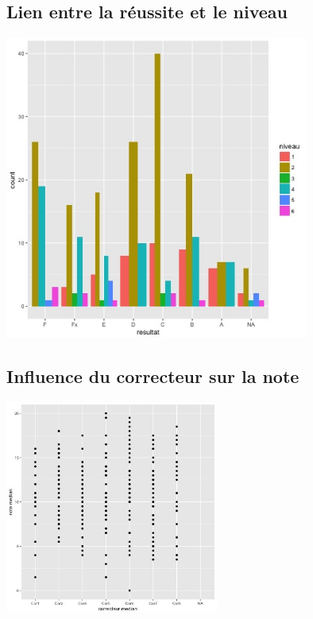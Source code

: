 \documentclass[]{report}
\begin{document}
\subsection{Lien entre la réussite et le niveau}

		\begin{center}
		\includegraphics[width=100mm]{Figures/Notes/niveau_resultat.jpg}
		\label{fig:niveau_resultat}
		\end{center}

\subsection{Influence du correcteur sur la note}

	\begin{center}
	\includegraphics[width=70mm]{Figures/Notes/correcteur_median.jpg}
	\label{fig:scatter_correcteur_median}
\end{center}
\end{document}
